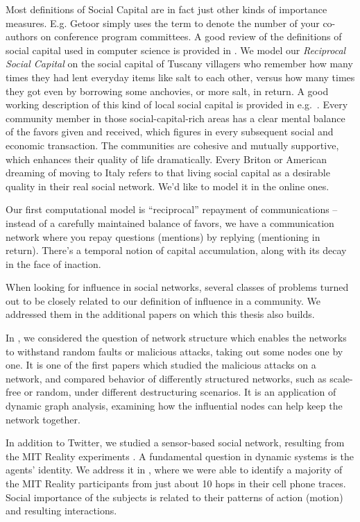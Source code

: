 \documentclass[10pt,oneside]{memoir}
\begin{document}
Most definitions of Social Capital are in fact just other kinds of importance measures. E.g. Getoor \cite{Licamele:2005:Benefit} simply uses the term to denote the number of your co-authors on conference program committees. A good review of the definitions of social capital used in computer science is provided in \cite{Motidyang:2007:Thesis}. We model our {\itshape Reciprocal Social Capital} on the social capital of Tuscany villagers who remember how many times they had lent everyday items like salt to each other, versus how many times they got even by borrowing some anchovies, or more salt, in return. A good working description of this kind of local social capital is provided in e.g.\ \cite{Gaggio:2007:Gold}. Every community member in those social-capital-rich areas has a clear mental balance of the favors given and received, which figures in every subsequent social and economic transaction.  The communities are cohesive and mutually supportive, which enhances their quality of life dramatically.  Every Briton or American dreaming of moving to Italy refers to that living social capital as a desirable quality in their real social network.  We'd like to model it in the online ones.


Our first computational model is ``reciprocal'' repayment of communications -- instead of a carefully maintained balance of favors, we have a communication network where you repay questions (mentions) by replying (mentioning in return). There's a temporal notion of capital accumulation, along with its decay in the face of inaction.


When looking for influence in social networks, several classes of problems turned out to be closely related to our definition of influence in a community. We addressed them in the additional papers on which this thesis also builds.


In \cite{Khrabrov:2003:Attacks}, we considered the question of network structure which enables the networks to withstand random faults or malicious attacks, taking out some nodes one by one. It is one of the first papers which studied the malicious attacks on a network, and compared behavior of differently structured networks, such as scale-free or random, under different destructuring scenarios. It is an application of dynamic graph analysis, examining how the influential nodes can help keep the network together.


In addition to Twitter, we studied a sensor-based social network, resulting from the MIT Reality experiments \cite{Eagle:2006:Reality}. A fundamental question in dynamic systems is the agents' identity. We address it in \cite{Khrabrov:2009:Language}, where we were able to identify a majority of the MIT Reality participants from just about 10 hops in their cell phone traces. Social importance of the subjects is related to their patterns of action (motion) and resulting interactions.
\end{document}
